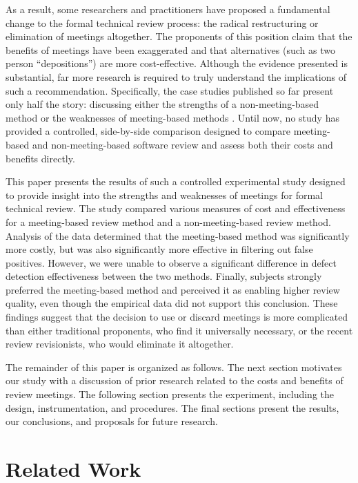 As a result, some researchers and practitioners have proposed a fundamental
change to the formal technical review process: the radical restructuring or
elimination of meetings altogether.  The proponents of this position claim
that the benefits of meetings have been exaggerated and that alternatives
(such as two person ``depositions'') are more cost-effective.  Although the
evidence presented is substantial, far more research is required to truly
understand the implications of such a recommendation. Specifically, the
case studies published so far present only half the story: discussing
either the strengths of a non-meeting-based method \cite{Parnas85} or the
weaknesses of meeting-based methods \cite{Votta93}. Until now, no study has
provided a controlled, side-by-side comparison designed to compare meeting-based and
non-meeting-based software review and assess both their costs and
benefits directly.

This paper presents the results of such a controlled experimental study designed
to provide insight into the strengths and weaknesses of meetings for
formal technical review. The study compared various measures of cost and
effectiveness for a meeting-based review method and a non-meeting-based
review method.  Analysis of the data determined that the meeting-based
method was significantly more costly, but was also significantly more effective
in filtering out false positives.  However, we were unable to observe a
significant difference in defect detection effectiveness between the two
methods.  Finally, subjects strongly preferred the meeting-based method
and perceived it as enabling higher review quality, even though the empirical
data did not support this conclusion.  These findings suggest that 
the decision to use or discard meetings is more complicated than either 
traditional proponents, who find it universally necessary, or the 
recent review revisionists, who would eliminate it altogether.

The remainder of this paper is organized as follows.  The next section
motivates our study with a discussion of prior research related to the
costs and benefits of review meetings. The following section presents the
experiment, including the design, instrumentation, and procedures. The
final sections present the results, our conclusions, and proposals for
future research.

\section{Related Work} 

